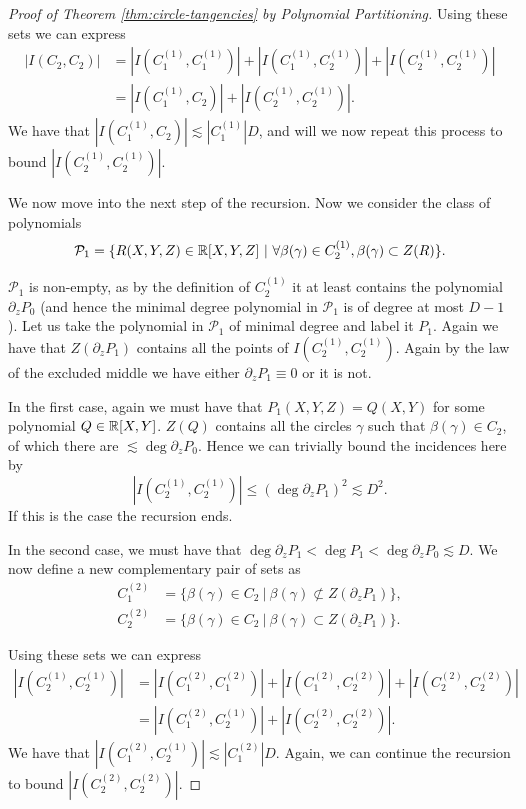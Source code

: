\begin{proof}[Proof of Theorem \ref{thm:circle-tangencies} by Polynomial Partitioning]
Using these sets we can express 
\begin{align*}
    |I(C_2,C_2)| &= \left| I\left(C_1^{(1)}, C_1^{(1)}\right) \right|+ \left|I\left(C_1^{(1)}, C_2^{(1)}\right)\right| +\left| I\left(C_2^{(1)}, C_2^{(1)}\right)\right| \\
    &= \left|I\left(C_1^{(1)}, C_2\right)\right| +\left| I\left(C_2^{(1)}, C_2^{(1)}\right)\right|. 
\end{align*}
We have that $\left|  I\left(C_1^{(1)}, C_2\right)\right| \lesssim \left|C_1^{(1)} \right| D$, and will we now repeat this process to bound $\left|I \left(C_2^{(1)}, C_2^{(1)}\right)\right|.$

We now move into the next step of the recursion. Now we consider the class of polynomials
\[
    \mathcal P_1 = \{ R(X,Y,Z) \in \mathbb R[X,Y,Z] \ | \ \forall \beta(\gamma) \in C_2^{(1)}, \beta(\gamma) \subset Z(R) \}. 
\]

$\mathcal P_1$ is non-empty, as by the definition of $C_2^{(1)}$ it at least contains the polynomial $\partial_z P_0$ (and hence the minimal degree polynomial in $\mathcal{P}_1$ is of degree at most $D-1$). Let us take the polynomial in $\mathcal P_1$ of minimal degree and label it $P_1$. Again we have that $Z(\partial_z P_1)$ contains all the points of $I\left(C_2^{(1)},C_2^{(1)}\right)$.  Again by the law of the excluded middle we have either $\partial_z P_1 \equiv 0$ or it is not. 

In the first case, again we must have that $P_1(X,Y,Z) = Q(X,Y)$ for some polynomial $Q \in \mathbb R[X,Y]$. $Z(Q)$ contains all the circles $\gamma$ such that $\beta (\gamma) \in C_2$, of which there are  $\lesssim \deg \partial_z P_0$. Hence we can trivially bound the incidences here by \[\left|I\left(C_2^{(1)},C_2^{(1)}\right)\right| \leq (\deg \partial_z P_1 )^2 \lesssim D^2.\] If this is the case the recursion ends. 

In the second case, we must have that $ \deg \partial_z P_1 < \deg P_1 < \deg \partial_z P_0 \lesssim D$. We now define a new complementary pair of sets as 
\begin{align*}
    C_1^{(2)} &= \{ \beta(\gamma) \in C_2 \ | \  \beta(\gamma) \not \subset Z(\partial_z P_1)  \}, \\
    C_2^{(2)} &=  \{ \beta(\gamma) \in C_2 \ | \  \beta(\gamma) \subset Z(\partial_z P_1)  \}.
\end{align*}

Using these sets we can express 
\begin{align*}
    \left|I\left(C_2^{(1)},C_2^{(1)}\right)\right| &= \left| I\left(C_1^{(2)}, C_1^{(2)}\right) \right|+ \left|I\left(C_1^{(2)}, C_2^{(2)}\right)\right| +\left| I\left(C_2^{(2)}, C_2^{(2)}\right)\right| \\
    &= \left|I\left(C_1^{(2)}, C_2^{(1)}\right)\right| +\left| I\left(C_2^{(2)}, C_2^{(2)}\right)\right|. 
\end{align*}
We have that $\left|  I\left(C_1^{(2)}, C_2^{(1)}\right)\right| \lesssim \left|C_1^{(2)} \right| D$. Again, we can continue the recursion to bound $\left|I \left(C_2^{(2)}, C_2^{(2)}\right)\right|.$


\end{proof}
